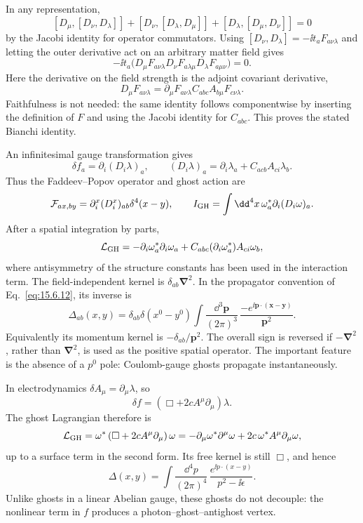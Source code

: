 \ExerciseEditorialNote

\begin{enumerate}
  In any representation,
  \[
    [D_\mu,[D_\nu,D_\lambda]]
    +[D_\nu,[D_\lambda,D_\mu]]
    +[D_\lambda,[D_\mu,D_\nu]]=0
  \]
  by the Jacobi identity for operator commutators.  Using
  \(
    [D_\nu,D_\lambda]=-\ii t_a F_{a\nu\lambda}
  \)
  and letting the outer derivative act on an arbitrary matter field gives
  \[
    -\ii t_a\bigl(
      D_\mu F_{a\nu\lambda}
      D_\nu F_{a\lambda\mu}
      D_\lambda F_{a\mu\nu}
    \bigr)=0.
  \]
  Here the derivative on the field strength is the adjoint covariant
  derivative,
  \[
    D_\mu F_{a\nu\lambda}
    =\partial_\mu F_{a\nu\lambda}
      C_{abc}A_{b\mu}F_{c\nu\lambda}.
  \]
  Faithfulness is not needed: the same identity follows componentwise by
  inserting the definition of \(F\) and using the Jacobi identity for
  \(C_{abc}\).  This proves the stated Bianchi identity.

  An infinitesimal gauge transformation gives
  \[
    \delta f_a
    =\partial_i(D_i\lambda)_a,\qquad
    (D_i\lambda)_a
    =\partial_i\lambda_a
      +C_{acb}A_{c i}\lambda_b .
  \]
  Thus the Faddeev--Popov operator and ghost action are
  \[
    \mathcal F_{a x,b y}
    =\partial_i^x(D_i^x)_{ab}\delta^4(x-y),
    \qquad
    I_{\rm GH}=\int \dd^4x\,
      \omega_a^*\partial_i(D_i\omega)_a .
  \]
  After a spatial integration by parts,
  \[
    \mathcal L_{\rm GH}
    =-\partial_i\omega_a^*\partial_i\omega_a
      +C_{abc}
       (\partial_i\omega_a^*)A_{c i}\omega_b ,
  \]
  where antisymmetry of the structure constants has been used in the
  interaction term.  The field-independent kernel is
  \(\delta_{ab}\boldsymbol\nabla^2\).  In the propagator convention
  of Eq.~\eqref{eq:15.6.12}, its inverse is
  \[
    \Delta_{ab}(x,y)
    =\delta_{ab}\delta(x^0-y^0)
      \int\frac{\dd^3\mathbf p}{(2\pi)^3}\,
      \frac{-e^{\ii\mathbf p\cdot(\mathbf x-\mathbf y)}}{\mathbf p^2}.
  \]
  Equivalently its momentum kernel is
  \(-\delta_{ab}/\mathbf p^2\).  The overall sign is reversed if
  \(-\boldsymbol\nabla^2\), rather than \(\boldsymbol\nabla^2\), is used as
  the positive spatial operator.  The important feature is the absence of a
  \(p^0\) pole: Coulomb-gauge ghosts propagate instantaneously.

  In electrodynamics \(\delta A_\mu=\partial_\mu\lambda\), so
  \[
    \delta f
      =\left(\Box+2cA^\mu\partial_\mu\right)\lambda .
  \]
  The ghost Lagrangian therefore is
  \[
    \mathcal L_{\rm GH}
      =\omega^*\left(\Box+2cA^\mu\partial_\mu\right)\omega
      =-\partial_\mu\omega^*\partial^\mu\omega
        +2c\,\omega^*A^\mu\partial_\mu\omega ,
  \]
  up to a surface term in the second form.  Its free kernel is still
  \(\Box\), and hence
  \[
    \Delta(x,y)
      =\int\frac{\dd^4p}{(2\pi)^4}\,
        \frac{e^{\ii p\cdot(x-y)}}{p^2-\ii\epsilon}.
  \]
  Unlike ghosts in a linear Abelian gauge, these ghosts do not decouple:
  the nonlinear term in \(f\) produces a photon--ghost--antighost vertex.


\end{enumerate}
